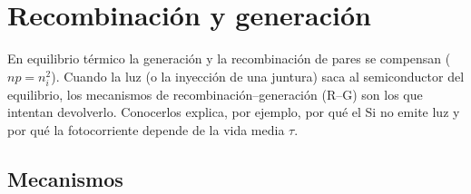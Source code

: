 \section{Recombinación y generación}
\label{sec:rg}

En equilibrio térmico la generación y la recombinación de pares se compensan
($np=n_i^2$). Cuando la luz (o la inyección de una juntura) saca al semiconductor del
equilibrio, los mecanismos de recombinación--generación (R--G) son los que intentan
devolverlo. Conocerlos explica, por ejemplo, por qué el Si no emite luz y por qué la
fotocorriente depende de la vida media $\tau$.

\subsection{Mecanismos}

